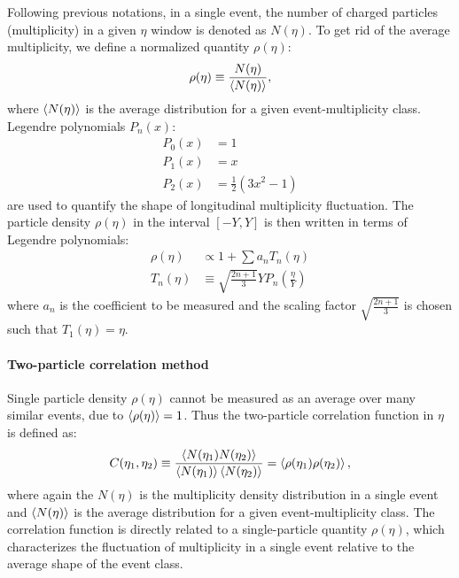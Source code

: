 Following previous notations, in a single event, the number of charged particles (multiplicity) in a given $\eta$ window is denoted as $N(\eta)$. To get rid of the average multiplicity, we define a normalized quantity $\rho(\eta)$:
\begin{equation}
\rho(\eta) \equiv \frac{N(\eta)}{\left\langle N(\eta)\right\rangle},
\end{equation}
where $\left\langle N(\eta)\right\rangle$ is the average distribution for a given event-multiplicity class. Legendre polynomials $P_n(x)$:
\begin{equation}
\begin{split}
P_0(x) &= 1 \\
P_1(x) &= x \\
P_2(x) &= \frac{1}{2}(3x^2 - 1)
\end{split}
\end{equation}
are used to quantify the shape of longitudinal multiplicity fluctuation. The particle density $\rho(\eta)$ in the interval $[-Y, Y]$ is then written in terms of Legendre polynomials:
\begin{equation}
\begin{split}
\rho(\eta) &\propto 1 + \sum a_n T_n(\eta) \\
T_n(\eta) &\equiv \sqrt{\frac{2n+1}{3}} Y P_n(\frac{\eta}{Y})
\end{split}
\end{equation}
where $a_n$ is the coefficient to be measured and the scaling factor $\sqrt{\frac{2n+1}{3}}$ is chosen such that $T_1(\eta)=\eta$.



\paragraph{Two-particle correlation method}

Single particle density $\rho(\eta)$ cannot be measured as an average over many similar events, due to $\left\langle \rho(\eta)\right\rangle = 1$. Thus the two-particle correlation function in $\eta$ is defined as:
\begin{equation}
C(\eta_1, \eta_2) \equiv \frac{\left\langle N(\eta_1)N(\eta_2)\right\rangle}{\left\langle N(\eta_1)\right\rangle\left\langle N(\eta_2)\right\rangle} = \left\langle \rho(\eta_1)\rho(\eta_2)\right\rangle,
\end{equation}
where again the $N(\eta)$ is the multiplicity density distribution in a single event and $\left\langle N(\eta)\right\rangle$ is the average distribution for a given event-multiplicity class. The correlation function is directly related to a single-particle quantity $\rho(\eta)$, which characterizes the fluctuation of multiplicity in a single event relative to the average shape of the event class.

